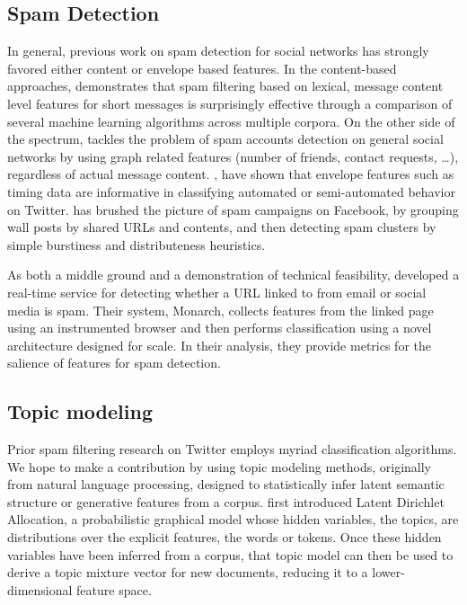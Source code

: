 \documentclass[times, 11pt, twocolumn]{article}
\begin{document}
\subsection{Spam Detection}
In general, previous work on spam detection for social networks has strongly favored either content or envelope based features. In the content-based approaches, \cite{Cormack2007} demonstrates that spam filtering based on lexical, message content level features for short messages is surprisingly effective through a comparison of several machine learning algorithms across multiple corpora. On the other side of the spectrum, \cite{Stringhini2010} tackles the problem of spam accounts detection on general social networks by using graph related features (number of friends, contact requests, \dots), regardless of actual message content. \cite{Zhang2011}, \cite{Ghosh2011} have shown that envelope features such as timing data are informative in classifying automated or semi-automated behavior on Twitter. \cite{Gao2010} has brushed the picture of spam campaigns on Facebook, by grouping wall posts by shared URLs and contents, and then detecting spam clusters by simple burstiness and distributeness heuristics.

As both a middle ground and a demonstration of technical feasibility, \cite{Thomas2011} developed a real-time service for detecting whether a URL linked to from email or social media is spam. Their system, Monarch, collects features from the linked page using an instrumented browser and then performs classification using a novel architecture designed for scale. In their analysis, they provide metrics for the salience of features for spam detection.

\subsection{Topic modeling}
Prior spam filtering research on Twitter employs myriad classification algorithms. We hope to make a contribution by using topic modeling methods, originally from natural language processing, designed to statistically infer latent semantic structure or generative features from a corpus. \cite{Blei2003} first introduced Latent Dirichlet Allocation, a probabilistic graphical model whose hidden variables, the topics, are distributions over the explicit features, the words or tokens. Once these hidden variables have been inferred from a corpus, that topic model can then be used to derive a topic mixture vector for new documents, reducing it to a lower-dimensional feature space.
\end{document}
